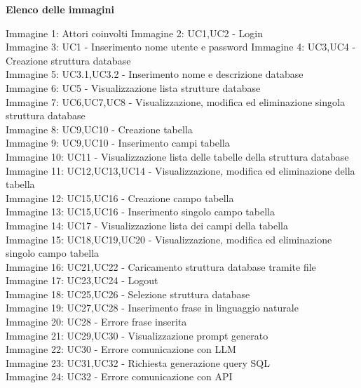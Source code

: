 \documentclass[5pt]{article}
\begin{document}
\pagebreak
\tableofcontents
\pagebreak
	\begin{flushleft}
\textbf{\Large Elenco delle immagini} 

\begin{spacing}{1.5} 

Immagine 1: Attori coinvolti \newline
Immagine 2: UC1,UC2 - Login \\
Immagine 3: UC1 - Inserimento nome utente e password \newline
Immagine 4: UC3,UC4 - Creazione struttura database \\
Immagine 5: UC3.1,UC3.2 - Inserimento nome e descrizione database \\
	Immagine 6: UC5 - Visualizzazione lista strutture database \\
	Immagine 7: UC6,UC7,UC8 - Visualizzazione, modifica ed eliminazione singola struttura database \\
	Immagine 8: UC9,UC10 - Creazione tabella \\
	Immagine 9: UC9,UC10 - Inserimento campi tabella \\
	Immagine 10: UC11 - Visualizzazione lista delle tabelle della struttura database \\
	Immagine 11: UC12,UC13,UC14 - Visualizzazione, modifica ed eliminazione della tabella \\
	Immagine 12: UC15,UC16 - Creazione campo tabella \\
	Immagine 13: UC15,UC16 - Inserimento singolo campo tabella \\
	Immagine 14: UC17 - Visualizzazione lista dei campi della tabella \\
	Immagine 15: UC18,UC19,UC20 - Visualizzazione, modifica ed eliminazione singolo campo tabella \\
	Immagine 16: UC21,UC22 - Caricamento struttura database tramite file \\
	Immagine 17: UC23,UC24 - Logout \\
	Immagine 18: UC25,UC26 - Selezione struttura database \\
	Immagine 19: UC27,UC28 - Inserimento frase in linguaggio naturale \\
	Immagine 20: UC28 - Errore frase inserita \\
	Immagine 21: UC29,UC30 - Visualizzazione prompt generato \\
	Immagine 22: UC30 - Errore comunicazione con LLM \\
	Immagine 23: UC31,UC32 - Richiesta generazione query SQL \\
	Immagine 24: UC32 - Errore comunicazione con API 
\end{spacing}
\end{flushleft}
\end{document}
